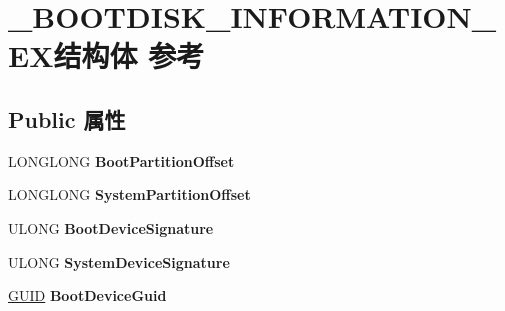 \hypertarget{struct___b_o_o_t_d_i_s_k___i_n_f_o_r_m_a_t_i_o_n___e_x}{}\section{\+\_\+\+B\+O\+O\+T\+D\+I\+S\+K\+\_\+\+I\+N\+F\+O\+R\+M\+A\+T\+I\+O\+N\+\_\+\+E\+X结构体 参考}
\label{struct___b_o_o_t_d_i_s_k___i_n_f_o_r_m_a_t_i_o_n___e_x}
\subsection*{Public 属性}
\begin{DoxyCompactItemize}
\item 
\mbox{\label{struct___b_o_o_t_d_i_s_k___i_n_f_o_r_m_a_t_i_o_n___e_x_adf925c92396ab541102ce4af8cc86b5f}} 
L\+O\+N\+G\+L\+O\+NG {\bfseries Boot\+Partition\+Offset}
\item 
\mbox{\label{struct___b_o_o_t_d_i_s_k___i_n_f_o_r_m_a_t_i_o_n___e_x_a22a3701ae9c44c43a307a684886cdcb3}} 
L\+O\+N\+G\+L\+O\+NG {\bfseries System\+Partition\+Offset}
\item 
\mbox{\label{struct___b_o_o_t_d_i_s_k___i_n_f_o_r_m_a_t_i_o_n___e_x_a02ec761b1c6150a11ba4c285e96a3f9d}} 
U\+L\+O\+NG {\bfseries Boot\+Device\+Signature}
\item 
\mbox{\label{struct___b_o_o_t_d_i_s_k___i_n_f_o_r_m_a_t_i_o_n___e_x_a4a32aa20a06cfcc98920adc64ccfd8ab}} 
U\+L\+O\+NG {\bfseries System\+Device\+Signature}
\item 
\mbox{\label{struct___b_o_o_t_d_i_s_k___i_n_f_o_r_m_a_t_i_o_n___e_x_aa2005211925d02d33e235c4cd8204614}} 
\hyperlink{interface_g_u_i_d}{G\+U\+ID} {\bfseries Boot\+Device\+Guid}
\item 
\mbox{\label{struct___b_o_o_t_d_i_s_k___i_n_f_o_r_m_a_t_i_o_n___e_x_a73409cd6998ffa0650ca9386e45bc0cc}} 

\end{DoxyCompactItemize}
